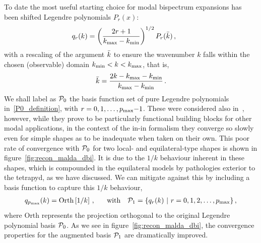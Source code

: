 To date the most useful starting choice for modal bispectrum expansions has been shifted Legendre polynomials $P_r(x)$:
\begin{align}\label{P0_definition}
    q_{r}(k) = \left(\frac{2r+1} {{k_\text{max}} - {k_\text{min}}}\right)^{1/2} P_r(\bar{k})\,,\qquad 
\end{align}
with a rescaling of the argument $\bar{k}$ to ensure the wavenumber $k$ falls within the chosen (observable) domain ${k_\text{min}}< k<{k_\text{max}}$, that is, 
\begin{align}\label{krescaled}
    \bar{k}=\frac{2k-{k_\text{max}}-{k_\text{min}}}{{k_\text{max}}-{k_\text{min}}}\,.
\end{align}
We shall label as $\mathcal{P}_0$ the basis function set of pure Legendre polynomials in~\eqref{P0_definition},
with $r=0,1,\dots, p_{\rm max}\text{$-$}1$.
These were considered also in~\cite{Funakoshi}, however,
while they prove to be particularly functional building blocks for other modal applications,
in the context of the in-in formalism
they converge so slowly even for simple shapes as to be inadequate when taken on their own.
This poor rate of convergence with $\mathcal{P}_0$ for two local- and equilateral-type shapes is shown in figure~\ref{fig:recon_malda_dbi}.
It is due to the $1/k$ behaviour inherent in these shapes,
which is compounded in the equilateral models by pathologies exterior to the tetrapyd,
as we have discussed.
We can mitigate against this by including a basis function to capture this $1/k$ behaviour, 
\begin{align}\label{P1_definition}
    q_{p_{\rm max}}(k) = \text{Orth}\left[{1}/ {k}\right]\,, ~~ \quad \text{with} \quad  \mathcal{P}_1 = \{ q_r(k) ~\vert~ r= 0, 1,2, \dots , p_{\rm max}\}\,,
\end{align}
where $\text{Orth}$ represents the projection orthogonal to the original Legendre polynomial basis $\mathcal{P}_0$.
As we see in figure~\ref{fig:recon_malda_dbi}, the convergence properties for the augmented basis  $\mathcal{P}_1$ are dramatically improved.

